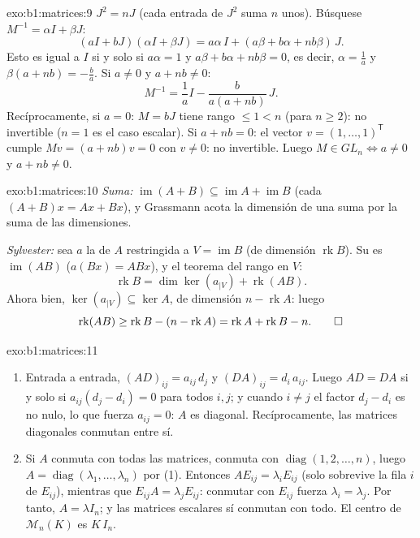 \begin{solution}{exo:b1:matrices:9}
$J^2 = nJ$ (cada entrada de $J^2$ suma $n$ unos). Búsquese
$M^{-1} = \alpha I + \beta J$:
\[
(aI + bJ)(\alpha I + \beta J)
= a\alpha\, I + (a\beta + b\alpha + nb\beta)\, J .
\]
Esto es igual a $I$ si y solo si $a\alpha = 1$ y
$a\beta + b\alpha + nb\beta = 0$, es decir, $\alpha = \frac1a$ y
$\beta(a + nb) = -\frac ba$. Si $a \neq 0$ y $a + nb \neq 0$:
\[
M^{-1} = \frac 1a I - \frac{b}{a(a + nb)}\, J .
\]
Recíprocamente, si $a = 0$: $M = bJ$ tiene rango $\leq 1 < n$ (para
$n \geq 2$): no invertible ($n = 1$ es el caso escalar). Si
$a + nb = 0$: el vector $v = (1, \dots, 1)^{\mathsf T}$ cumple
$Mv = (a + nb)v = 0$ con $v \neq 0$: no invertible. Luego
$M \in GL_n \iff a \neq 0$ y $a + nb \neq 0$.
\end{solution}

\begin{solution}{exo:b1:matrices:10}
\emph{Suma:}
$\operatorname{im}(A + B) \subseteq \operatorname{im} A +
\operatorname{im} B$ (cada $(A+B)x = Ax + Bx$), y Grassmann acota la
dimensión de una suma por la suma de las dimensiones.

\emph{Sylvester:} sea $a$ la  de $A$ restringida a
$V = \operatorname{im} B$ (de dimensión $\operatorname{rk} B$). Su
 es $\operatorname{im}(AB)$ ($a(Bx) = ABx$), y el teorema del
rango en $V$:
\[
\operatorname{rk} B = \dim\ker(a_{|V}) + \operatorname{rk}(AB) .
\]
Ahora bien, $\ker(a_{|V}) \subseteq \ker A$, de dimensión
$n - \operatorname{rk} A$: luego
\[
\operatorname{rk}(AB) \geq \operatorname{rk} B - (n -
\operatorname{rk} A) = \operatorname{rk} A + \operatorname{rk} B -
n . \qedhere
\]
\end{solution}

\begin{solution}{exo:b1:matrices:11}
\begin{enumerate}
  \item Entrada a entrada, $(AD)_{ij} = a_{ij}\,d_j$ y
        $(DA)_{ij} = d_i\,a_{ij}$. Luego $AD = DA$ si y solo si
        $a_{ij}(d_j - d_i) = 0$ para todos $i, j$; y cuando
        $i \neq j$ el factor $d_j - d_i$ es no nulo, lo que fuerza
        $a_{ij} = 0$: $A$ es diagonal. Recíprocamente, las matrices
        diagonales conmutan entre sí.
  \item Si $A$ conmuta con todas las matrices, conmuta con
        $\operatorname{diag}(1, 2, \dots, n)$, luego
        $A = \operatorname{diag}(\lambda_1, \dots, \lambda_n)$ por
        (1). Entonces $A E_{ij} = \lambda_i E_{ij}$ (solo sobrevive
        la fila $i$ de $E_{ij}$), mientras que
        $E_{ij} A = \lambda_j E_{ij}$: conmutar con $E_{ij}$ fuerza
        $\lambda_i = \lambda_j$. Por tanto, $A = \lambda I_n$; y las
        matrices escalares sí conmutan con todo. El centro de
        $\mathcal{M}_n(K)$ es $K\,I_n$.
\end{enumerate}
\end{solution}

